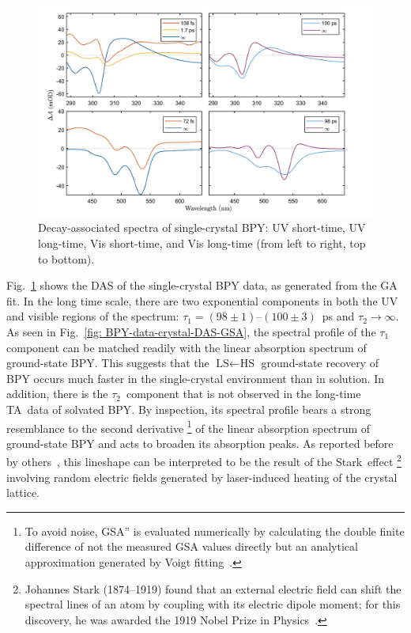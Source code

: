 \begin{figure}[t!]
  \centering
  \includegraphics[width = \textwidth]{Figures/fig_BPY_data_crystal_DAS.pdf}
  \caption[Decay-associated spectra of single-crystal BPY.]{
    Decay-associated spectra of single-crystal BPY:
    UV short-time, UV long-time, Vis short-time, and Vis long-time
    (from left to right, top to bottom).
  }
  \label{fig: BPY-data-crystal-DAS}
\end{figure}
%
Fig.~\ref{fig: BPY-data-crystal-DAS} shows the DAS of the single-crystal BPY data,
as generated from the GA fit.
%
In the long time scale, there are two exponential components in both the UV and
visible regions of the spectrum: $\tau_1 = (98 \pm 1)$--$(100 \pm 3)$~ps
and $\tau_2 \rightarrow \infty$.
%
As seen in Fig.~\ref{fig: BPY-data-crystal-DAS-GSA},
the spectral profile of the $\tau_1$ component can be matched readily
with the linear absorption spectrum of ground-state BPY.
%
This suggests that the $\text{LS} \leftarrow \text{HS}$ ground-state recovery of BPY
occurs much faster in the single-crystal environment than in solution.
%
In addition, there is the $\tau_2$~component that is not observed in
the long-time TA~data of solvated BPY.
By inspection, its spectral profile bears a strong resemblance to
the second derivative%
\footnote{To avoid noise, GSA'' is evaluated numerically
by calculating the double finite difference of not the measured GSA values directly
but an analytical approximation generated by Voigt fitting~\cite{Abrarov2011}.}
of the linear absorption spectrum of ground-state BPY
and acts to broaden its absorption peaks.
%
As reported before by others~\cite{Colvin1993, Farztdinov1997},
this lineshape can be interpreted to be the result of the Stark~effect%
\footnote{Johannes Stark (1874--1919) found that an external electric field
can shift the spectral lines of an atom by coupling with its electric dipole moment;
for this discovery, he was awarded the 1919 Nobel Prize in Physics~\cite{Nobel1901}.}
involving random electric fields generated by laser-induced heating
of the crystal lattice.

